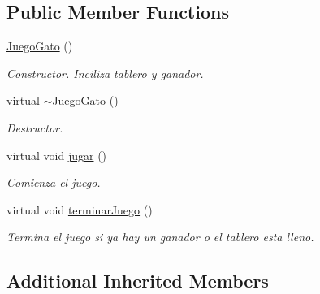 \subsection*{Public Member Functions}
\begin{DoxyCompactItemize}
\item 
\hyperlink{class_juego_gato_a6b948d319360d774592c8ac0cf0071a2}{Juego\+Gato} ()\hypertarget{class_juego_gato_a6b948d319360d774592c8ac0cf0071a2}{}\label{class_juego_gato_a6b948d319360d774592c8ac0cf0071a2}

\begin{DoxyCompactList}\small\item\em Constructor. Inciliza tablero y ganador. \end{DoxyCompactList}\item 
virtual \hyperlink{class_juego_gato_a437f6521c043c739580cda9292926d5b}{$\sim$\+Juego\+Gato} ()\hypertarget{class_juego_gato_a437f6521c043c739580cda9292926d5b}{}\label{class_juego_gato_a437f6521c043c739580cda9292926d5b}

\begin{DoxyCompactList}\small\item\em Destructor. \end{DoxyCompactList}\item 
virtual void \hyperlink{class_juego_gato_a59466c4b571c4f8d571f8594565f164d}{jugar} ()\hypertarget{class_juego_gato_a59466c4b571c4f8d571f8594565f164d}{}\label{class_juego_gato_a59466c4b571c4f8d571f8594565f164d}

\begin{DoxyCompactList}\small\item\em Comienza el juego. \end{DoxyCompactList}\item 
virtual void \hyperlink{class_juego_gato_a73773d53339b0e50afc76c7806c9f142}{terminar\+Juego} ()\hypertarget{class_juego_gato_a73773d53339b0e50afc76c7806c9f142}{}\label{class_juego_gato_a73773d53339b0e50afc76c7806c9f142}

\begin{DoxyCompactList}\small\item\em Termina el juego si ya hay un ganador o el tablero esta lleno. \end{DoxyCompactList}\end{DoxyCompactItemize}
\subsection*{Additional Inherited Members}


